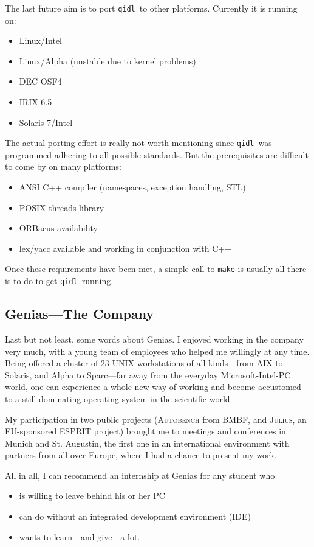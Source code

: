 \documentclass[a4paper, titlepage, twoside]{article}
\newcommand{\qidl}{{\tt qidl}}
\begin{document}
The last future aim is to port \qidl\ to other platforms. Currently it is
running on:
\begin{itemize}
\item Linux/Intel
\item Linux/Alpha (unstable due to kernel problems)
\item DEC OSF4
\item IRIX 6.5
\item Solaris 7/Intel
\end{itemize}
The actual porting effort is really not worth mentioning since \qidl\ was
programmed adhering to all possible standards. But the prerequisites are
difficult to come by on many platforms:
\begin{itemize}
\item ANSI C++ compiler (namespaces, exception handling, STL)
\item POSIX threads library
\item ORBacus availability
\item lex/yacc available and working in conjunction with C++
\end{itemize}
Once these requirements have been met, a simple call to \texttt{make} is
usually all there is to do to get \qidl\ running.

\subsection{Genias---The Company}
Last but not least, some words about Genias. I enjoyed working in the company
very much, with a young team of employees who helped me willingly at any time.
Being offered a cluster of 23 UNIX
workstations of all kinds---from AIX to Solaris, and Alpha to Sparc---far away
from the everyday Microsoft-Intel-PC world, one can experience a whole new
way of working and become accustomed to a still dominating operating system
in the scientific world.

My participation in two public projects (\textsc{Autobench} from BMBF, and
\textsc{Julius}, an EU-sponsored ESPRIT project) brought me to meetings and
conferences in Munich and St. Augustin, the first one in an international
environment with partners from all over Europe, where I had a chance to
present my work.

All in all, I can recommend an internship at Genias for any student who
\begin{itemize}
\item is willing to leave behind his or her PC
\item can do without an integrated development environment (IDE)
\item wants to learn---and give---a lot.
\end{itemize}

\newpage
\nocite{*}


\end{document}
